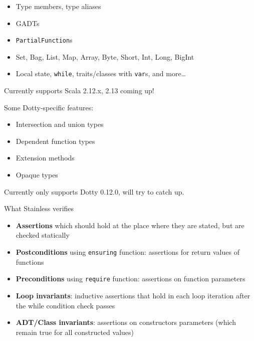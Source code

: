 \documentclass[
  ignorenonframetext,
]{beamer}
\providecommand{\tightlist}{%
  \setlength{\itemsep}{0pt}\setlength{\parskip}{0pt}}
\begin{document}
\begin{frame}[fragile]

\begin{itemize}
\tightlist
\item
  Type members, type aliases
\item
  GADTs
\item
  \texttt{PartialFunction}s
\item
  Set, Bag, List, Map, Array, Byte, Short, Int, Long, BigInt
\item
  Local state, \texttt{while}, traits/classes with \texttt{var}s, and
  more\ldots{}
\end{itemize}

Currently supports Scala 2.12.x, 2.13 coming up!

\end{frame}

\begin{frame}

Some Dotty-specific features:

\begin{itemize}
\tightlist
\item
  Intersection and union types
\item
  Dependent function types
\item
  Extension methods
\item
  Opaque types
\end{itemize}

Currently only supports Dotty 0.12.0, will try to catch up.

\end{frame}

\begin{frame}[fragile]{What Stainless verifies}
\protect\hypertarget{what-stainless-verifies}{}

\begin{itemize}
\tightlist
\item
  \textbf{Assertions} which should hold at the place where they are
  stated, but are checked statically
\item
  \textbf{Postconditions} using \texttt{ensuring} function: assertions
  for return values of functions
\item
  \textbf{Preconditions} using \texttt{require} function: assertions on
  function parameters
\item
  \textbf{Loop invariants}: inductive assertions that hold in each loop
  iteration after the while condition check passes
\item
  \textbf{ADT/Class invariants}: assertions on constructors parameters
  (which remain true for all constructed values)
\end{itemize}

\end{frame}
\end{document}
